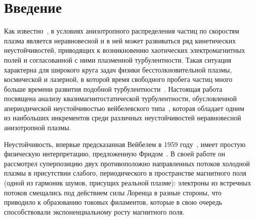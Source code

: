 \chapter*{Введение}                         %
\newcommand{\me}{m_\mathrm{e}}
\newcommand{\wpl}{\omega_\mathrm{p}}
Как известно~\cite{Mikhailovsky1971}, в условиях анизотропного распределения частиц по скоростям плазма является неравновесной и в ней может развиваться ряд кинетических неустойчивостей, приводящих к возникновению хаотических электромагнитных полей и согласованной с ними плазменной турбулентности. Такая ситуация характерна для широкого круга задач физики бесстолкновительной плазмы, космической и лазерной, в которой время свободного пробега частиц много больше времени развития подобной турбулентности~\cite{Baumjohann2012, Treumann2009, Marcowith2016}. Настоящая работа посвящена анализу квазимагнитостатической турбулентности, обусловленной апериодической неустойчивостью вейбелевского типа~\cite{Weibel1959, Fried1959, Kocharovsky2016}, которая обладает одним из наибольших инкрементов среди различных неустойчивостей неравновесной анизотропной плазмы. 

Неустойчивость, впервые предсказанная Вейбелем в 1959 году~\cite{Weibel1959}, имеет простую физическую интерпретацию, предложенную Фридом~\cite{Fried1959}. В своей работе он рассмотрел суперпозицию двух противоположно направленных потоков холодной плазмы в присутствии слабого, периодического в пространстве магнитного поля (одной из гармоник шумов, присущих реальной плазме): электроны из встречных потоков смещались под действием силы Лоренца в разные стороны, что приводило к образованию токовых филаментов, которые в свою очередь способствовали экспоненциальному росту магнитного поля. 

